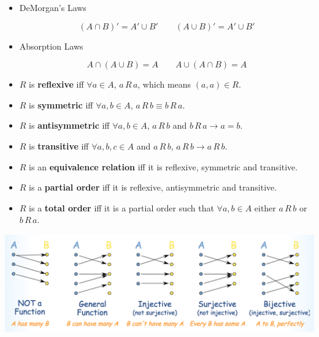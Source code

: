 \documentclass[12pt]{scrartcl}
\begin{document}
\begin{itemize}
    \item DeMorgan's Laws

        \begin{equation*}
            (A \cap B)' = A' \cup B' \qquad (A \cup B)' = A' \cup B'
        \end{equation*}

    \item Absorption Laws

        \begin{equation*}
            A \cap (A \cup B) = A \qquad A \cup (A \cap B) = A
        \end{equation*}

    \item $R$ is \textbf{reflexive} iff $\forall a \in A$, $a\, R\, a$, which means $(a, a) \in R$.
    \item $R$ is \textbf{symmetric} iff $\forall a, b \in A$, $a\, R\, b \equiv b\, R\, a$.
    \item $R$ is \textbf{antisymmetric} iff $\forall a, b \in A$, $a\, R\, b$ and $b\, R\, a \rightarrow a = b$.
    \item $R$ is \textbf{transitive} iff $\forall a, b, c \in A$ and $a\, R\, b$, $a\, R\, b \rightarrow a\, R\, b$.
    \item $R$ is an \textbf{equivalence relation} iff it is reflexive, symmetric and transitive.
    \item $R$ is a \textbf{partial order} iff it is reflexive, antisymmetric and transitive.
    \item $R$ is a \textbf{total order} iff it is a partial order such that $\forall a, b \in A$ either $a\, R\, b$ or $b\, R\, a$.
\end{itemize}

\includegraphics[width=\textwidth]{./assets/injective-etc.png}
\end{document}
